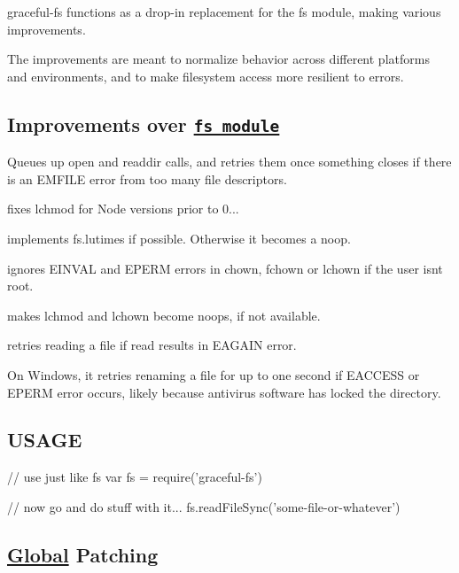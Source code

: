 graceful-\/fs functions as a drop-\/in replacement for the fs module, making various improvements.

The improvements are meant to normalize behavior across different platforms and environments, and to make filesystem access more resilient to errors.

\subsection*{Improvements over \href{https://nodejs.org/api/fs.html}{\tt fs module}}


\begin{DoxyItemize}
\item Queues up {\ttfamily open} and {\ttfamily readdir} calls, and retries them once something closes if there is an E\+M\+F\+I\+LE error from too many file descriptors.
\item fixes {\ttfamily lchmod} for Node versions prior to 0...
\item implements {\ttfamily fs.\+lutimes} if possible. Otherwise it becomes a noop.
\item ignores {\ttfamily E\+I\+N\+V\+AL} and {\ttfamily E\+P\+E\+RM} errors in {\ttfamily chown}, {\ttfamily fchown} or {\ttfamily lchown} if the user isn\textquotesingle{}t root.
\item makes {\ttfamily lchmod} and {\ttfamily lchown} become noops, if not available.
\item retries reading a file if {\ttfamily read} results in E\+A\+G\+A\+IN error.
\end{DoxyItemize}

On Windows, it retries renaming a file for up to one second if {\ttfamily E\+A\+C\+C\+E\+SS} or {\ttfamily E\+P\+E\+RM} error occurs, likely because antivirus software has locked the directory.

\subsection*{U\+S\+A\+GE}


\begin{DoxyCode}
// use just like fs
var fs = require('graceful-fs')

// now go and do stuff with it...
fs.readFileSync('some-file-or-whatever')
\end{DoxyCode}


\subsection*{\hyperlink{class_global}{Global} Patching}

